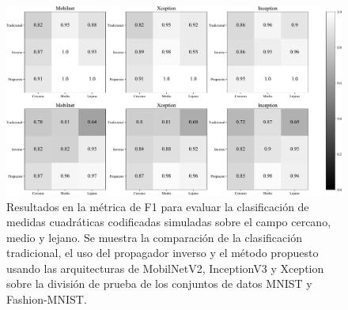 \begin{figure}[!h]
    \centering
    \includegraphics[width=\linewidth]{images/test_result_F1.pdf}
    \caption{Resultados en la métrica de F1 para evaluar la clasificación de medidas cuadráticas codificadas simuladas sobre el campo cercano, medio y lejano. Se muestra la comparación de la clasificación tradicional, el uso del propagador inverso y el método propuesto usando las arquitecturas de MobilNetV2, InceptionV3 y Xception sobre la división de prueba de los conjuntos de datos MNIST y Fashion-MNIST.}
    \label{fig:results_f1}
\end{figure}